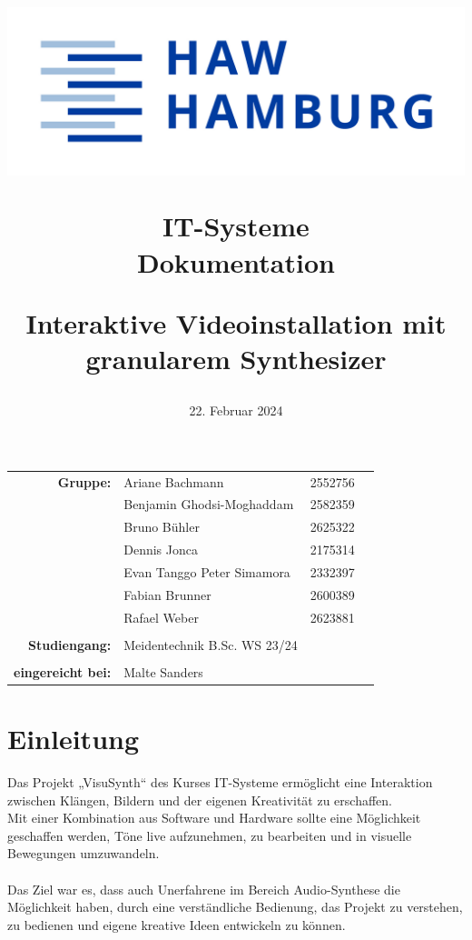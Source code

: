 \documentclass[12pt]{scrartcl}%
\title{
\begin{flushright}
 \includegraphics[scale=0.5]{HAW_Marke_RGB_300dpi.jpg}
\end{flushright}

\vspace{2cm}

IT-Systeme\\
Dokumentation
 
\vspace{1cm}

\LARGE Interaktive Videoinstallation mit\\
granularem Synthesizer
}
\date{22. Februar 2024}
\theoremstyle{nonumberplain}
\begin{document}
\begin{titlepage}


\maketitle %


\vfill 

\begin{flushleft}
\begin{tabular}{rlll}
\textbf{Gruppe:} & Ariane Bachmann & 2552756 & \hspace{5cm} \\
 & Benjamin Ghodsi-Moghaddam & 2582359 & \hspace{5cm} \\
 & Bruno Bühler & 2625322 & \hspace{5cm} \\
  & Dennis Jonca & 2175314 & \hspace{5cm} \\
   & Evan Tanggo Peter Simamora & 2332397 & \hspace{5cm} \\
    & Fabian Brunner &  2600389 & \hspace{5cm} \\
& Rafael Weber & 2623881 & \hspace{5cm} \\\\
\textbf{Studiengang:} & Meidentechnik B.Sc. WS 23/24 & \hspace{5cm} \\\\
\textbf{eingereicht bei:} & Malte Sanders & \hspace{5cm} \\ 
\end{tabular}
\end{flushleft}

\end{titlepage}

\tableofcontents

\newpage

\section{Einleitung}


Das Projekt „VisuSynth“ des Kurses IT-Systeme ermöglicht eine Interaktion zwischen Klängen, Bildern und der eigenen Kreativität zu erschaffen.\\
Mit einer Kombination aus Software und Hardware sollte eine Möglichkeit geschaffen werden, Töne live aufzunehmen, zu bearbeiten und in visuelle Bewegungen umzuwandeln.
\\\\
Das Ziel war es, dass auch Unerfahrene im Bereich Audio-Synthese die Möglichkeit haben, durch eine verständliche Bedienung, das Projekt zu verstehen, zu bedienen und eigene kreative Ideen entwickeln zu können.
\end{document}
